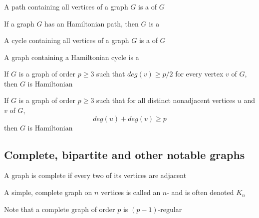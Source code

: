 \documentclass[aspectratio=169]{beamer}\usepackage[]{graphicx}\usepackage[]{xcolor}
\begin{document}
\begin{frame}\frametitle{}
\begin{definition}
	A path containing all vertices of a graph $G$ is a  of $G$
\end{definition}
\vfill
\begin{definition}
	If a graph $G$ has an Hamiltonian path, then $G$ is a 
\end{definition}
\vfill
\begin{definition}
	A cycle containing all vertices of a graph $G$ is a  of $G$
\end{definition}
\vfill
\begin{definition}
	A graph containing a Hamiltonian cycle is a 
\end{definition}
\end{frame}

\begin{frame}
\begin{theorem}
	If $G$ is a graph of order $p\geq 3$ such that $deg(v)\geq p/2$ for every vertex $v$ of $G$, then $G$ is Hamiltonian
\end{theorem}
\vfill
\begin{theorem}
	If $G$ is a graph of order $p\geq 3$ such that for all distinct nonadjacent vertices $u$ and $v$ of $G$, $$deg(u)+deg(v)\geq p$$ 
	then $G$ is Hamiltonian
\end{theorem}
\end{frame}

\subsection{Complete, bipartite and other notable graphs}


\begin{frame}
\begin{definition}
A graph is complete if every two of its vertices are adjacent
\end{definition}
\vfill
\begin{definition}[$n$-clique]
	A simple, complete graph on $n$ vertices is called an $n$- and is often denoted $K_n$
\end{definition}
\vfill
Note that a complete graph of order $p$ is $(p-1)$-regular
\end{frame}
\end{document}

